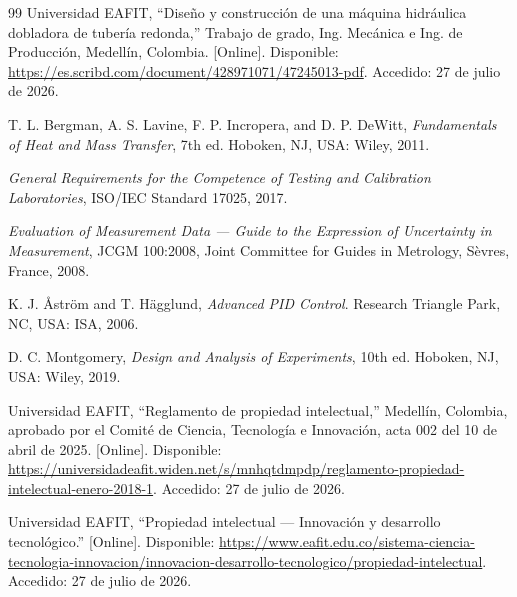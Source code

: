 \begin{thebibliography}{99}
Universidad EAFIT, ``Diseño y construcción de una máquina hidráulica dobladora de tubería redonda,'' Trabajo de grado, Ing. Mecánica e Ing. de Producción, Medellín, Colombia. [Online]. Disponible: \url{https://es.scribd.com/document/428971071/47245013-pdf}. Accedido: 27 de julio de 2026.

T. L. Bergman, A. S. Lavine, F. P. Incropera, and D. P. DeWitt, \emph{Fundamentals of Heat and Mass Transfer}, 7th ed. Hoboken, NJ, USA: Wiley, 2011.

\emph{General Requirements for the Competence of Testing and Calibration Laboratories}, ISO/IEC Standard 17025, 2017.

\emph{Evaluation of Measurement Data --- Guide to the Expression of Uncertainty in Measurement}, JCGM 100:2008, Joint Committee for Guides in Metrology, Sèvres, France, 2008.

K. J. Åström and T. Hägglund, \emph{Advanced PID Control}. Research Triangle Park, NC, USA: ISA, 2006.

D. C. Montgomery, \emph{Design and Analysis of Experiments}, 10th ed. Hoboken, NJ, USA: Wiley, 2019.

Universidad EAFIT, ``Reglamento de propiedad intelectual,'' Medellín, Colombia, aprobado por el Comité de Ciencia, Tecnología e Innovación, acta 002 del 10 de abril de 2025. [Online]. Disponible: \url{https://universidadeafit.widen.net/s/mnhqtdmpdp/reglamento-propiedad-intelectual-enero-2018-1}. Accedido: 27 de julio de 2026.

Universidad EAFIT, ``Propiedad intelectual --- Innovación y desarrollo tecnológico.'' [Online]. Disponible: \url{https://www.eafit.edu.co/sistema-ciencia-tecnologia-innovacion/innovacion-desarrollo-tecnologico/propiedad-intelectual}. Accedido: 27 de julio de 2026.

\end{thebibliography}
